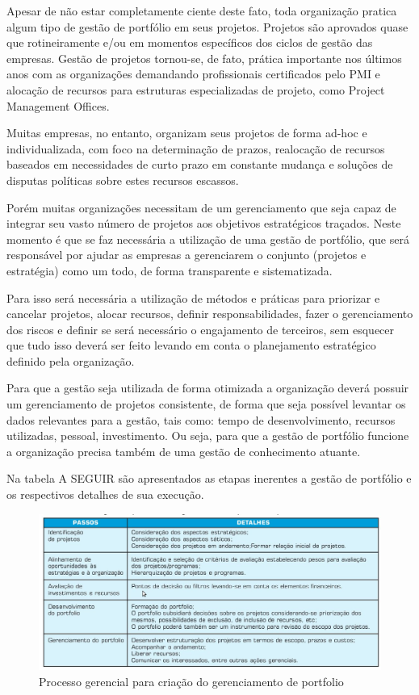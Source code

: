 \documentclass[12pt,a4paper,ruledheader,tocpage=prefix,floatnumber=continuous,pagestart=folhaderosto,font=times]{abnt}
\begin{document}
Apesar de não estar completamente ciente deste fato, toda organização pratica algum tipo de gestão de portfólio em seus projetos. Projetos são aprovados 
quase que rotineiramente e/ou em momentos específicos dos ciclos de gestão das empresas. Gestão de projetos tornou-se, de fato, prática importante nos 
últimos anos com as organizações demandando profissionais certificados pelo PMI e alocação de recursos para estruturas especializadas de projeto, 
como Project Management Offices. 

Muitas empresas, no entanto, organizam seus projetos de forma ad-hoc e individualizada, com foco na determinação de prazos, realocação de recursos 
baseados em necessidades de curto prazo em constante mudança e soluções de disputas políticas sobre estes recursos escassos.\cite{artigo}

Porém muitas organizações necessitam de um gerenciamento que seja capaz de integrar seu vasto número de projetos aos objetivos estratégicos traçados.
Neste momento é que se faz necessária a utilização de uma gestão de portfólio, que será responsável por ajudar as empresas a gerenciarem o conjunto 
(projetos e estratégia) como um todo, de forma transparente e sistematizada. 

Para isso será necessária a utilização de métodos e práticas para priorizar e cancelar projetos, alocar recursos, definir responsabilidades, fazer o 
gerenciamento dos riscos e definir se será necessário o engajamento de terceiros, sem esquecer que tudo isso deverá ser feito levando em conta o 
planejamento estratégico definido pela organização.

Para que a gestão seja utilizada de forma otimizada a organização deverá possuir um gerenciamento de projetos consistente, de forma que seja possível 
levantar os dados relevantes para a gestão, tais como: tempo de desenvolvimento, recursos utilizadas, pessoal, investimento. Ou seja, para que a gestão 
de portfólio funcione a organização precisa também de uma gestão de conhecimento atuante.

Na tabela A SEGUIR são apresentados as etapas inerentes a gestão de portfólio e os respectivos detalhes de sua execução.

\begin{figure}[H]
\centering
\includegraphics[width=.9\textwidth]{crawford.jpg}
\caption{Processo gerencial para criação do gerenciamento de portfolio \cite{crawford}}
\end{figure} 
\end{document}
